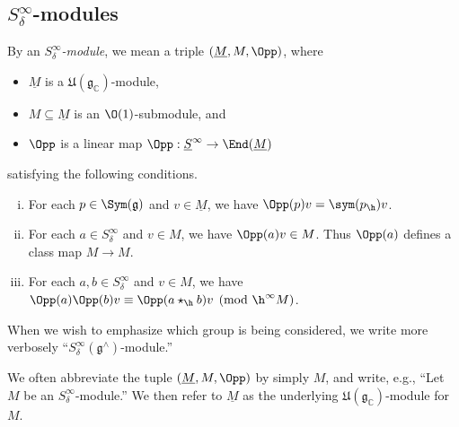 \subsection{$S^\infty_\delta$-modules}\label{sec:sinfty_delta-modules}

\begin{definition}\label{defn:s-infinity-delta-module}
  By an \emph{$S_\delta^\infty$-module}, we mean a triple $(\underline{M}, M, \Opp)$, where
  \begin{itemize}
  \item $\underline{M}$ is a $\mathfrak{U}(\mathfrak{g}_\mathbb{C})$-module,
  \item $M \subseteq \underline{M}$ is an $\O(1)$-submodule, and
  \item $\Opp$ is a linear map $\Opp : \underline{S}^\infty \rightarrow \End(\underline{M})$
  \end{itemize}
  satisfying the following conditions.
  \begin{enumerate}[(i)]
  \item  \label{item:Sinfdelmod-1} For each $p \in \Sym(\mathfrak{g})$ and $v \in \underline{M}$, we have $\Opp(p) v = \sym(p_{\h}) v$.
  \item \label{item:Sinfdelmod-2} For each $a \in S_\delta^\infty$ and $v \in M$, we have $\Opp(a) v \in M$.  Thus $\Opp(a)$ defines a class map $M \rightarrow M$.
  \item \label{item:Sinfdelmod-3} For each $a,b \in S^\infty_\delta$ and $v \in M$, we have $\Opp(a) \Opp(b) v \equiv \Opp(a \star_{\h} b) v \pmod{\h^\infty M}$.
  \end{enumerate}
  When we wish to emphasize which group is being considered, we write more verbosely ``$S^\infty_\delta(\mathfrak{g}^\wedge)$-module.''
\end{definition}
We often abbreviate the tuple $(\underline{M}, M, \Opp)$ by simply $M$, and write, e.g., ``Let $M$ be an $S_\delta^\infty$-module.''  We then refer to $\underline{M}$ as the underlying $\mathfrak{U}(\mathfrak{g}_\mathbb{C})$-module for $M$.


